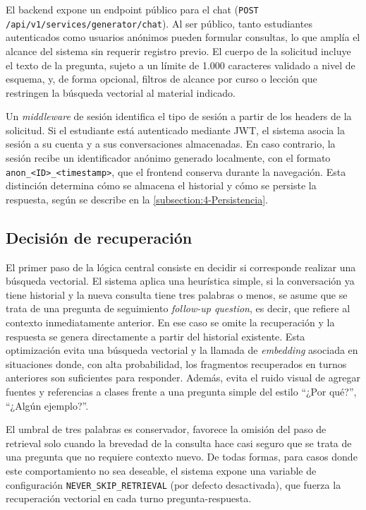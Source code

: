 El backend expone un endpoint público para el chat (\texttt{POST /api/v1/services/generator/chat}). Al ser público, tanto estudiantes autenticados como usuarios anónimos pueden formular consultas, lo que amplía el alcance del sistema sin requerir registro previo. El cuerpo de la solicitud incluye el texto de la pregunta, sujeto a un límite de 1.000 caracteres validado a nivel de esquema, y, de forma opcional, filtros de alcance por curso o lección que restringen la búsqueda vectorial al material indicado.

Un \textit{middleware} de sesión identifica el tipo de sesión a partir de los headers de la solicitud. Si el estudiante está autenticado mediante JWT, el sistema asocia la sesión a su cuenta y a sus conversaciones almacenadas. En caso contrario, la sesión recibe un identificador anónimo generado localmente, con el formato \texttt{anon\_<ID>\_<timestamp>}, que el frontend conserva durante la navegación. Esta distinción determina cómo se almacena el historial y cómo se persiste la respuesta, según se describe en la \autoref{subsection:4-Persistencia}.

\subsection{Decisión de recuperación}
\label{subsection:4-Decision-Recuperacion}

El primer paso de la lógica central consiste en decidir si corresponde realizar una búsqueda vectorial. El sistema aplica una heurística simple, si la conversación ya tiene historial y la nueva consulta tiene tres palabras o menos, se asume que se trata de una pregunta de seguimiento \textit{follow-up question}, es decir, que refiere al contexto inmediatamente anterior. En ese caso se omite la recuperación y la respuesta se genera directamente a partir del historial existente. Esta optimización evita una búsqueda vectorial y la llamada de \textit{embedding} asociada en situaciones donde, con alta probabilidad, los fragmentos recuperados en turnos anteriores son suficientes para responder. Además, evita el ruido visual de agregar fuentes y referencias a clases frente a una pregunta simple del estilo ``¿Por qué?'', ``¿Algún ejemplo?''.

El umbral de tres palabras es conservador, favorece la omisión del paso de retrieval solo cuando la brevedad de la consulta hace casi seguro que se trata de una pregunta que no requiere contexto nuevo. De todas formas, para casos donde este comportamiento no sea deseable, el sistema expone una variable de configuración \texttt{NEVER\_SKIP\_RETRIEVAL} (por defecto desactivada), que fuerza la recuperación vectorial en cada turno pregunta-respuesta.

